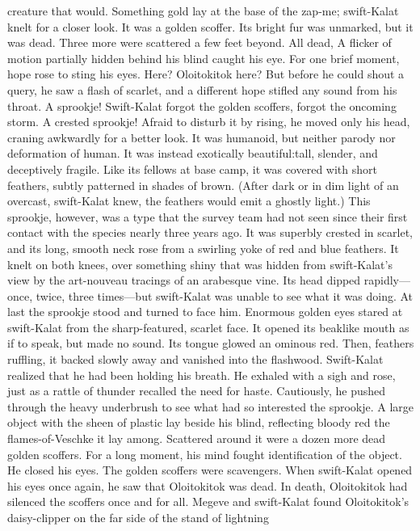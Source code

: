 \documentclass[9pt]{article}
\begin{document}
creature that would.
Something gold lay at the base of the zap-me; swift-Kalat knelt for a closer look.
It was a golden scoffer. Its bright fur was unmarked, but it was dead. Three more were scattered a
few feet beyond. All dead,
A flicker of motion partially hidden behind his blind caught his eye. For one brief moment, hope rose
to sting his eyes. Here? Oloitokitok here? But before he could shout a query, he saw a flash of scarlet,
and a different hope stifled any sound from his throat.
A sprookje!
Swift-Kalat forgot the golden scoffers, forgot the oncoming storm. A crested sprookje! Afraid to
disturb it by rising, he moved only his head, craning awkwardly for a better look.
It was humanoid, but neither parody nor deformation of human. It was instead exotically beautiful:tall, slender, and deceptively fragile. Like its fellows at base camp, it was covered with short feathers,
subtly patterned in shades of brown. (After dark or in dim light of an overcast, swift-Kalat knew, the
feathers would emit a ghostly light.)
This sprookje, however, was a type that the survey team had not seen since their first contact with
the species nearly three years ago. It was superbly crested in scarlet, and its long, smooth neck rose from
a swirling yoke of red and blue feathers.
It knelt on both knees, over something shiny that was hidden from swift-Kalat’s view by the
art-nouveau tracings of an arabesque vine. Its head dipped rapidly—once, twice, three times—but
swift-Kalat was unable to see what it was doing.
At last the sprookje stood and turned to face him. Enormous golden eyes stared at swift-Kalat from
the sharp-featured, scarlet face. It opened its beaklike mouth as if to speak, but made no sound. Its
tongue glowed an ominous red. Then, feathers ruffling, it backed slowly away and vanished into the
flashwood.
Swift-Kalat realized that he had been holding his breath. He exhaled with a sigh and rose, just as a
rattle of thunder recalled the need for haste.
Cautiously, he pushed through the heavy underbrush to see what had so interested the sprookje. A
large object with the sheen of plastic lay beside his blind, reflecting bloody red the flames-of-Veschke it
lay among. Scattered around it were a dozen more dead golden scoffers. For a long moment, his mind
fought identification of the object.
He closed his eyes. The golden scoffers were scavengers. When swift-Kalat opened his eyes once
again, he saw that Oloitokitok was dead. In death, Oloitokitok had silenced the scoffers once and for all.
Megeve and swift-Kalat found Oloitokitok’s daisy-clipper on the far side of the stand of lightning
\end{document}

